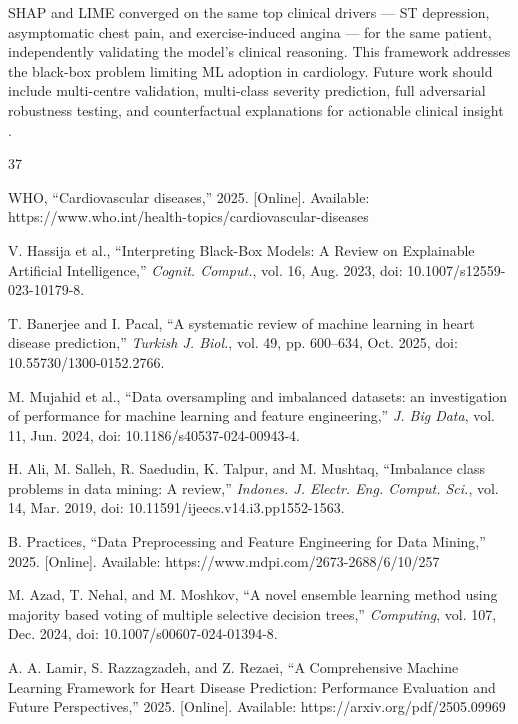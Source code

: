 \documentclass[conference]{IEEEtran}
\begin{document}
SHAP and LIME converged on the same top clinical drivers — ST depression, asymptomatic chest pain, and exercise-induced angina — for the same patient, independently validating the model's clinical reasoning. This framework addresses the black-box problem limiting ML adoption in cardiology. Future work should include multi-centre validation, multi-class severity prediction, full adversarial robustness testing, and counterfactual explanations for actionable clinical insight \cite{sharma2025}.



\begin{thebibliography}{37}

WHO, ``Cardiovascular diseases,'' 2025. [Online]. Available: https://www.who.int/health-topics/cardiovascular-diseases

V. Hassija et al., ``Interpreting Black-Box Models: A Review on Explainable Artificial Intelligence,'' \textit{Cognit. Comput.}, vol. 16, Aug. 2023, doi: 10.1007/s12559-023-10179-8.

T. Banerjee and I. Pacal, ``A systematic review of machine learning in heart disease prediction,'' \textit{Turkish J. Biol.}, vol. 49, pp. 600--634, Oct. 2025, doi: 10.55730/1300-0152.2766.

M. Mujahid et al., ``Data oversampling and imbalanced datasets: an investigation of performance for machine learning and feature engineering,'' \textit{J. Big Data}, vol. 11, Jun. 2024, doi: 10.1186/s40537-024-00943-4.

H. Ali, M. Salleh, R. Saedudin, K. Talpur, and M. Mushtaq, ``Imbalance class problems in data mining: A review,'' \textit{Indones. J. Electr. Eng. Comput. Sci.}, vol. 14, Mar. 2019, doi: 10.11591/ijeecs.v14.i3.pp1552-1563.

B. Practices, ``Data Preprocessing and Feature Engineering for Data Mining,'' 2025. [Online]. Available: https://www.mdpi.com/2673-2688/6/10/257

M. Azad, T. Nehal, and M. Moshkov, ``A novel ensemble learning method using majority based voting of multiple selective decision trees,'' \textit{Computing}, vol. 107, Dec. 2024, doi: 10.1007/s00607-024-01394-8.

A. A. Lamir, S. Razzagzadeh, and Z. Rezaei, ``A Comprehensive Machine Learning Framework for Heart Disease Prediction: Performance Evaluation and Future Perspectives,'' 2025. [Online]. Available: https://arxiv.org/pdf/2505.09969


\end{thebibliography}
\end{document}
